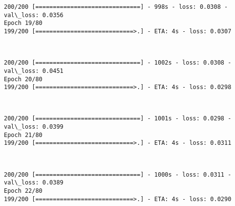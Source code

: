\documentclass[11pt]{article}
\begin{document}
    \begin{Verbatim}[commandchars=\\\{\}]
200/200 [==============================] - 998s - loss: 0.0308 - val\_loss: 0.0356
Epoch 19/80
199/200 [============================>.] - ETA: 4s - loss: 0.0307
    \end{Verbatim}

    \begin{center}
    \end{center}
    { \hspace*{\fill} \\}
    
    \begin{Verbatim}[commandchars=\\\{\}]
200/200 [==============================] - 1002s - loss: 0.0308 - val\_loss: 0.0451
Epoch 20/80
199/200 [============================>.] - ETA: 4s - loss: 0.0298
    \end{Verbatim}

    \begin{center}
    \end{center}
    { \hspace*{\fill} \\}
    
    \begin{Verbatim}[commandchars=\\\{\}]
200/200 [==============================] - 1001s - loss: 0.0298 - val\_loss: 0.0399
Epoch 21/80
199/200 [============================>.] - ETA: 4s - loss: 0.0311
    \end{Verbatim}

    \begin{center}
    \end{center}
    { \hspace*{\fill} \\}
    
    \begin{Verbatim}[commandchars=\\\{\}]
200/200 [==============================] - 1000s - loss: 0.0311 - val\_loss: 0.0389
Epoch 22/80
199/200 [============================>.] - ETA: 4s - loss: 0.0290
    \end{Verbatim}

    \begin{center}
    \end{center}
    { \hspace*{\fill} \\}
    
\end{document}
